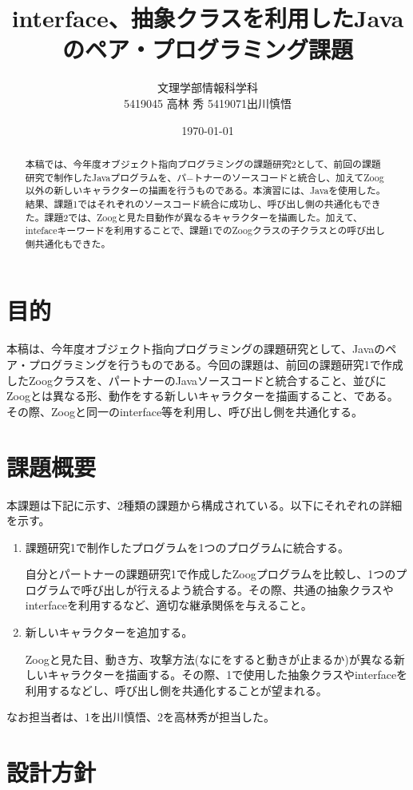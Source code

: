 \documentclass[dvipdfmx]{jsarticle}
\title{interface、抽象クラスを利用したJavaのペア・プログラミング課題}
\author{文理学部情報科学科\\5419045 高林 秀 5419071出川慎悟}
\date{\today}
\begin{document}
\maketitle

\begin{abstract}
  本稿では、今年度オブジェクト指向プログラミングの課題研究2として、前回の課題研究で制作したJavaプログラムを、パ−トナーのソースコードと統合し、加えてZoog以外の新しいキャラクターの描画を行うものである。本演習には、Javaを使用した。
  結果、課題1ではそれぞれのソースコード統合に成功し、呼び出し側の共通化もできた。課題2では、Zoogと見た目動作が異なるキャラクターを描画した。加えて、intefaceキーワードを利用することで、課題1でのZoogクラスの子クラスとの呼び出し側共通化もできた。
\end{abstract}

\section{目的}
本稿は、今年度オブジェクト指向プログラミングの課題研究として、Javaのペア・プログラミングを行うものである。今回の課題は、前回の課題研究1で作成したZoogクラスを、パートナーのJavaソースコードと統合すること、並びにZoogとは異なる形、動作をする新しいキャラクターを描画すること、である。その際、Zoogと同一のinterface等を利用し、呼び出し側を共通化する。

\section{課題概要}
本課題は下記に示す、2種類の課題から構成されている。以下にそれぞれの詳細を示す。\par
\begin{enumerate}
  \item 課題研究1で制作したプログラムを1つのプログラムに統合する。\par
  自分とパートナーの課題研究1で作成したZoogプログラムを比較し、1つのプログラムで呼び出しが行えるよう統合する。その際、共通の抽象クラスやinterfaceを利用するなど、適切な継承関係を与えること。
  \item 新しいキャラクターを追加する。\par
  Zoogと見た目、動き方、攻撃方法(なにをすると動きが止まるか)が異なる新しいキャラクターを描画する。その際、1で使用した抽象クラスやinterfaceを利用するなどし、呼び出し側を共通化することが望まれる。
\end{enumerate}
なお担当者は、1を出川慎悟、2を高林秀が担当した。
\section{設計方針}
\end{document}
